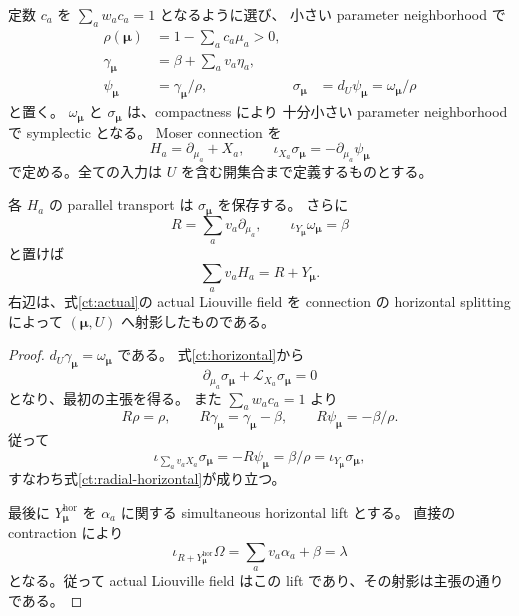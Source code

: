 定数 $c_a$ を $\sum_aw_ac_a=1$ となるように選び、
小さい parameter neighborhood で
\begin{align*}
 \rho(\boldsymbol\mu)&=1-\sum_ac_a\mu_a>0,\\
 \gamma_{\boldsymbol\mu}&=\beta+\sum_av_a\eta_a,\\
 \psi_{\boldsymbol\mu}&=\gamma_{\boldsymbol\mu}/\rho,
 &\sigma_{\boldsymbol\mu}&=d_U\psi_{\boldsymbol\mu}
                 =\omega_{\boldsymbol\mu}/\rho
\end{align*}
と置く。
$\omega_{\boldsymbol\mu}$ と $\sigma_{\boldsymbol\mu}$ は、compactness により
十分小さい parameter neighborhood で symplectic となる。
Moser connection を
\begin{equation}\label{ct:horizontal}
 H_a=\partial_{\mu_a}+X_a,
 \qquad
 \iota_{X_a}\sigma_{\boldsymbol\mu}
       =-\partial_{\mu_a}\psi_{\boldsymbol\mu}
\end{equation}
で定める。全ての入力は $U$ を含む開集合まで定義するものとする。

\begin{proposition}
\label{ct:liouville}
各 $H_a$ の parallel transport は $\sigma_{\boldsymbol\mu}$ を保存する。
さらに
\[
 R=\sum_a v_a\partial_{\mu_a},
 \qquad
 \iota_{Y_{\boldsymbol\mu}}\omega_{\boldsymbol\mu}=\beta
\]
と置けば
\begin{equation}\label{ct:radial-horizontal}
 \sum_a v_aH_a=R+Y_{\boldsymbol\mu}.
\end{equation}
右辺は、式\eqref{ct:actual}の actual Liouville field を
connection の horizontal splitting によって $(\boldsymbol\mu,U)$ へ射影したものである。
\end{proposition}

\begin{proof}
$d_U\gamma_{\boldsymbol\mu}=\omega_{\boldsymbol\mu}$ である。
式\eqref{ct:horizontal}から
\[
 \partial_{\mu_a}\sigma_{\boldsymbol\mu}
       +\mathcal L_{X_a}\sigma_{\boldsymbol\mu}=0
\]
となり、最初の主張を得る。
また $\sum_aw_ac_a=1$ より
\[
 R\rho=\rho,
 \qquad R\gamma_{\boldsymbol\mu}
       =\gamma_{\boldsymbol\mu}-\beta,
 \qquad R\psi_{\boldsymbol\mu}=-\beta/\rho.
\]
従って
\[
 \iota_{\sum_av_aX_a}\sigma_{\boldsymbol\mu}
       =-R\psi_{\boldsymbol\mu}
       =\beta/\rho
       =\iota_{Y_{\boldsymbol\mu}}\sigma_{\boldsymbol\mu},
\]
すなわち式\eqref{ct:radial-horizontal}が成り立つ。

最後に $Y_{\boldsymbol\mu}^{\mathrm{hor}}$ を $\alpha_a$ に関する simultaneous horizontal lift とする。
直接の contraction により
\[
 \iota_{R+Y_{\boldsymbol\mu}^{\mathrm{hor}}}\Omega
       =\sum_av_a\alpha_a+\beta=\lambda
\]
となる。従って actual Liouville field はこの lift であり、その射影は主張の通りである。
\end{proof}


